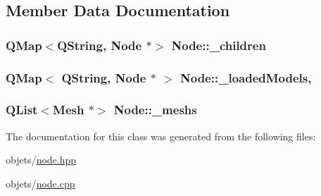 \subsection{Member Data Documentation}
\hypertarget{class_node_aac0c3b4b1f41b26ec5a22d77f067ec5b}{
\subsubsection[{\+\_\+children}]{\setlength{\rightskip}{0pt plus 5cm}Q\+Map$<$Q\+String, {\bf Node} $\ast$$>$ Node\+::\+\_\+children\hspace{0.3cm}{\ttfamily [private]}}}\label{class_node_aac0c3b4b1f41b26ec5a22d77f067ec5b}
\hypertarget{class_node_a082b475f17808deeb73c07d311f45073}{
\subsubsection[{\+\_\+loaded\+Models}]{\setlength{\rightskip}{0pt plus 5cm}Q\+Map$<$ Q\+String, {\bf Node} $\ast$ $>$ Node\+::\+\_\+loaded\+Models\hspace{0.3cm}{\ttfamily [static]}, {\ttfamily [private]}}}\label{class_node_a082b475f17808deeb73c07d311f45073}
\hypertarget{class_node_aad5e459a1ed03d6e09ad7054f2014f5a}{
\subsubsection[{\+\_\+meshs}]{\setlength{\rightskip}{0pt plus 5cm}Q\+List$<${\bf Mesh} $\ast$$>$ Node\+::\+\_\+meshs\hspace{0.3cm}{\ttfamily [private]}}}\label{class_node_aad5e459a1ed03d6e09ad7054f2014f5a}


The documentation for this class was generated from the following files\+:\begin{DoxyCompactItemize}
\item 
objets/\hyperlink{node_8hpp}{node.\+hpp}\item 
objets/\hyperlink{node_8cpp}{node.\+cpp}\end{DoxyCompactItemize}
